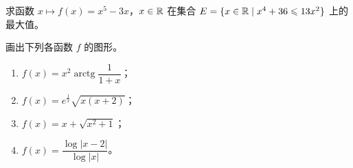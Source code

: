 \begin{exercise}
	\item 求函数 $x\longmapsto f(x)=x^5-3x$，$x\in\mathbb{R}$ 在集合 $E=\{x\in\mathbb{R}\mid x^4+36\leqslant13x^2\}$ 上的最大值。
\end{exercise}

\begin{exercise}
	\item 画出下列各函数 $f$ 的图形。
	\begin{enumerate}[label=\arabic*)]
		\item $f(x)=x^2\operatorname{arctg}\dfrac{1}{1+x}$；
		\item $f(x)=e^{\frac{1}{x}}\sqrt{x(x+2)}$；
		\item $f(x)=x+\sqrt{x^2+1}$；
		\item $f(x)=\dfrac{\log|x-2|}{\log|x|}$。
	\end{enumerate}
\end{exercise}
